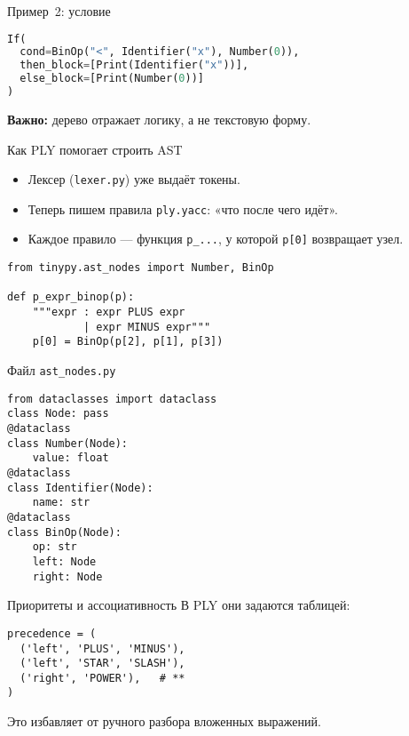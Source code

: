 \documentclass[aspectratio=169]{beamer}
\begin{document}
\begin{frame}[fragile]{Пример 2: условие}
	\begin{lstlisting}[language=Python]
If(
  cond=BinOp("<", Identifier("x"), Number(0)),
  then_block=[Print(Identifier("x"))],
  else_block=[Print(Number(0))]
)
\end{lstlisting}

	\textbf{Важно:} дерево отражает логику, а не текстовую форму.
\end{frame}

\begin{frame}[fragile]{Как PLY помогает строить AST}
	\begin{itemize}
		\item Лексер (\lstinline|lexer.py|) уже выдаёт токены.
		\item Теперь пишем правила \texttt{ply.yacc}: «что после чего идёт».
		\item Каждое правило — функция \lstinline|p_...|, у которой \lstinline|p[0]| возвращает узел.
	\end{itemize}
	\pause
	\begin{lstlisting}
from tinypy.ast_nodes import Number, BinOp

def p_expr_binop(p):
    """expr : expr PLUS expr
            | expr MINUS expr"""
    p[0] = BinOp(p[2], p[1], p[3])
\end{lstlisting}
\end{frame}

\begin{frame}[fragile]{Файл \texttt{ast\_nodes.py}}
	\begin{lstlisting}
from dataclasses import dataclass
class Node: pass
@dataclass
class Number(Node):
    value: float
@dataclass
class Identifier(Node):
    name: str
@dataclass
class BinOp(Node):
    op: str
    left: Node
    right: Node
\end{lstlisting}
\end{frame}

\begin{frame}[fragile]{Приоритеты и ассоциативность}
	В PLY они задаются таблицей:
	\begin{lstlisting}
precedence = (
  ('left', 'PLUS', 'MINUS'),
  ('left', 'STAR', 'SLASH'),
  ('right', 'POWER'),   # **
)
\end{lstlisting}
	Это избавляет от ручного разбора вложенных выражений.
\end{frame}
\end{document}
